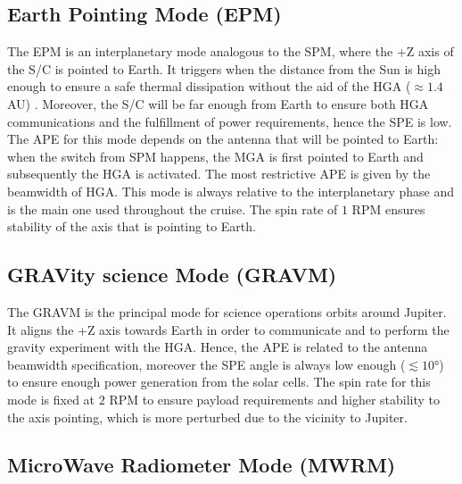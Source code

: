 \subsection{Earth Pointing Mode (EPM)}
\label{subsec:earth_pointing_mode}

The EPM is an interplanetary mode analogous to the SPM, where the +Z axis of the S/C is pointed to Earth.
It triggers when the distance from the Sun is high enough to ensure a safe thermal dissipation without the aid of the HGA ($\approx 1.4$ AU) \cite{kurth}.
Moreover, the S/C will be far enough from Earth to ensure both HGA communications and the fulfillment of power requirements, hence the SPE is low. The APE for this mode depends on the antenna that will be pointed to Earth: when the switch from SPM happens, the MGA is first pointed to Earth and subsequently the HGA is activated. The most restrictive APE is given by the beamwidth of HGA. This mode is always relative to the interplanetary phase and is the main one used throughout the cruise. The spin rate of $1$ RPM ensures stability of the axis that is pointing to Earth.

\subsection{GRAVity science Mode (GRAVM)}
\label{subsec:grav_mode}

The GRAVM is the principal mode for science operations orbits around Jupiter. It aligns the +Z axis towards Earth in order to communicate and to perform the gravity experiment with the HGA.
Hence, the APE is related to the antenna beamwidth specification, moreover the SPE angle is always low enough ($\lesssim 10$°) \cite{stuart} to ensure enough power generation from the solar cells.
The spin rate for this mode is fixed at $2$ RPM to ensure payload requirements and higher stability to the axis pointing, which is more perturbed due to the vicinity to Jupiter. 

\subsection{MicroWave Radiometer Mode (MWRM)}
\label{subsec:mwr_mode}

